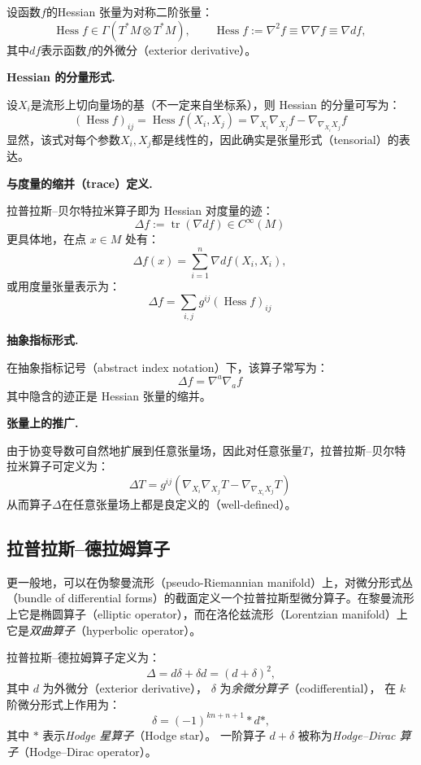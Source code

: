 设函数$f$的Hessian 张量为对称二阶张量：
\[
\operatorname{Hess} f \in \Gamma(T^{*}M \otimes T^{*}M), \qquad
\operatorname{Hess} f := \nabla^{2} f \equiv \nabla \nabla f \equiv \nabla df,~
\]
其中$df$表示函数$f$的外微分（exterior derivative）。

\textbf{Hessian 的分量形式.}

设$X_{i}$是流形上切向量场的基（不一定来自坐标系），则 Hessian 的分量可写为：
\[
(\operatorname{Hess} f)_{ij}
= \operatorname{Hess} f(X_{i}, X_{j})
= \nabla_{X_{i}} \nabla_{X_{j}} f - \nabla_{\nabla_{X_{i}} X_{j}} f~
\]
显然，该式对每个参数$X_{i}, X_{j}$都是线性的，因此确实是张量形式（tensorial）的表达。

\textbf{与度量的缩并（trace）定义.}

拉普拉斯–贝尔特拉米算子即为 Hessian 对度量的迹：
\[
\Delta f := \operatorname{tr} (\nabla df) \in C^{\infty}(M)~
\]
更具体地，在点 $x \in M$ 处有：
\[
\Delta f(x) = \sum_{i=1}^{n} \nabla df(X_{i}, X_{i}),~
\]
或用度量张量表示为：
\[
\Delta f = \sum_{i,j} g^{ij} (\operatorname{Hess} f)_{ij}~
\]

\textbf{抽象指标形式.}

在抽象指标记号（abstract index notation）下，该算子常写为：
\[
\Delta f = \nabla^{a} \nabla_{a} f~
\]
其中隐含的迹正是 Hessian 张量的缩并。

\textbf{张量上的推广.}

由于协变导数可自然地扩展到任意张量场，因此对任意张量$T$，拉普拉斯–贝尔特拉米算子可定义为：
\[
\Delta T
= g^{ij} \left(
    \nabla_{X_{i}} \nabla_{X_{j}} T
    - \nabla_{\nabla_{X_{i}} X_{j}} T
  \right)~
\]
从而算子$\Delta$在任意张量场上都是良定义的（well-defined）。
\subsection{拉普拉斯–德拉姆算子}
更一般地，可以在伪黎曼流形（pseudo-Riemannian manifold）上，对微分形式丛（bundle of differential forms）的截面定义一个拉普拉斯型微分算子。在黎曼流形上它是椭圆算子（elliptic operator），而在洛伦兹流形（Lorentzian manifold）上它是\emph{双曲算子}（hyperbolic operator）。

拉普拉斯–德拉姆算子定义为：
\[
\Delta = d\delta + \delta d = (d + \delta)^{2},
\]
其中 $d$ 为外微分（exterior derivative），
$\delta$ 为\emph{余微分算子}（codifferential），
在 $k$ 阶微分形式上作用为：
\[
\delta = (-1)^{kn + n + 1} * d *,
\]
其中 $*$ 表示\emph{Hodge 星算子}（Hodge star）。
一阶算子 $d + \delta$ 被称为\emph{Hodge–Dirac 算子}（Hodge–Dirac operator）\cite{ref5}。

